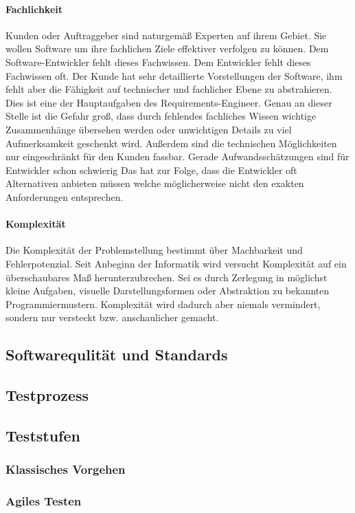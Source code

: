 \paragraph{Fachlichkeit}
Kunden oder Auftraggeber sind naturgemäß Experten auf ihrem Gebiet. Sie wollen Software um ihre fachlichen Ziele effektiver verfolgen zu können. Dem Software-Entwickler fehlt dieses Fachwissen. Dem Entwickler fehlt dieses Fachwissen oft.
Der Kunde hat sehr detaillierte Vorstellungen der Software, ihm fehlt aber die Fähigkeit auf technischer und fachlicher Ebene zu abstrahieren. Dies ist eine der Hauptaufgaben des Requirements-Engineer. Genau an dieser Stelle ist die Gefahr groß, dass durch fehlendes fachliches Wissen wichtige Zusammenhänge übersehen werden oder unwichtigen Details zu viel Aufmerksamkeit geschenkt wird.
Außerdem sind die technischen Möglichkeiten nur eingeschränkt für den Kunden fassbar. Gerade Aufwandsschätzungen sind für Entwickler schon schwierig Das hat zur Folge, dass die Entwickler oft Alternativen anbieten müssen welche möglicherweise nicht den exakten Anforderungen entsprechen.

\paragraph{Komplexität}
Die Komplexität der Problemstellung bestimmt über Machbarkeit und Fehlerpotenzial. Seit Anbeginn der Informatik wird versucht Komplexität auf ein überschaubares Maß herunterzubrechen. Sei es durch Zerlegung in möglichst kleine Aufgaben, visuelle Darstellungsformen oder Abstraktion zu bekannten Programmiermustern.
Komplexität wird dadurch aber niemals vermindert, sondern nur versteckt bzw. anschaulicher gemacht.


\subsection{Softwarequlität und Standards}
\subsection{Testprozess}
\subsection{Teststufen}
\subsubsection{Klassisches Vorgehen}
\subsubsection{Agiles Testen}
